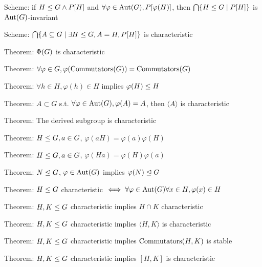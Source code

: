 \LA{}Scheme: if $H\leq G\land P[H]$ and $\forall\varphi\in\operatorname{Aut}(G),P[\varphi(H)]$, then $\bigcap\{H\leq G\mid P[H]\}$ is $\operatorname{Aut}(G)$-invariant~{\nwtagstyle{}}\RA{}

\LA{}Scheme: $\bigcap\{A\subseteq G\mid\exists H\leq G, A=H, P[H]\}$ is characteristic~{\nwtagstyle{}}\RA{}

\LA{}Theorem: $\operatorname{\Phi}(G)$ is characteristic~{\nwtagstyle{}}\RA{}

\LA{}Theorem: $\forall\varphi\in G,\varphi(\operatorname{Commutators}(G))=\operatorname{Commutators}(G)$~{\nwtagstyle{}}\RA{}

\LA{}Theorem: $\forall h\in H,\varphi(h)\in H$ implies $\varphi(H)\leq H$~{\nwtagstyle{}}\RA{}

\LA{}Theorem: $A\subset G$ s.t. $\forall\varphi\in\operatorname{Aut}(G),\varphi(A)=A$, then $\langle A\rangle$ is characteristic~{\nwtagstyle{}}\RA{}

\LA{}Theorem: The derived subgroup is characteristic~{\nwtagstyle{}}\RA{}

\LA{}Theorem: $H\leq G, a\in G$, $\varphi(aH)=\varphi(a)\varphi(H)$~{\nwtagstyle{}}\RA{}

\LA{}Theorem: $H\leq G, a\in G$, $\varphi(Ha)=\varphi(H)\varphi(a)$~{\nwtagstyle{}}\RA{}

\LA{}Theorem: $N\trianglelefteq G$, $\varphi\in\operatorname{Aut}(G)$ implies $\varphi(N)\trianglelefteq G$~{\nwtagstyle{}}\RA{}

\LA{}Theorem: $H\leq G$ characteristic $\iff\forall\varphi\in\operatorname{Aut}(G)\forall x\in H,\varphi(x)\in H$~{\nwtagstyle{}}\RA{}

\LA{}Theorem: $H,K\leq G$ characteristic implies $H\cap K$ characteristic~{\nwtagstyle{}}\RA{}

\LA{}Theorem: $H,K\leq G$ characteristic implies $\langle H, K\rangle$ is characteristic~{\nwtagstyle{}}\RA{}

\LA{}Theorem: $H,K\leq G$ characteristic implies ${\rm Commutators}(H,K)$ is stable~{\nwtagstyle{}}\RA{}

\LA{}Theorem: $H,K\leq G$ characteristic implies $[H,K]$ is characteristic~{\nwtagstyle{}}\RA{}
\nwendcode{}\nwdocspar


